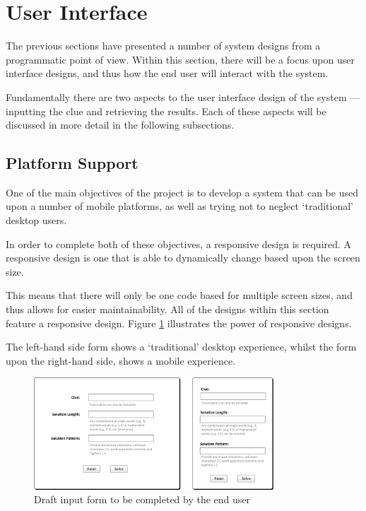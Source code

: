 \section{User Interface}
\label{sec:design_user_interface}

The previous sections have presented a number of system designs from a 
programmatic point of view. Within this section, there will be a focus upon 
user interface designs, and thus how the end user will interact with the system.

Fundamentally there are two aspects to the user interface design of the system 
--- inputting the clue and retrieving the results. Each of these aspects will 
be discussed in more detail in the following subsections.


\subsection{Platform Support} 
\label{sub:platform_support}

One of the main objectives of the project is to develop a system that can be 
used upon a number of mobile platforms, as well as trying not to neglect 
`traditional' desktop users.

In order to complete both of these objectives, a responsive design is required.
A responsive design is one that is able to dynamically change based upon the 
screen size.

This means that there will only be one code based for multiple screen sizes, and
thus allows for easier maintainability. All of the designs within this section 
feature a responsive design. Figure \ref{fig:input_form_compare} illustrates the
power of responsive designs.

The left-hand side form shows a `traditional' desktop experience, whilst the 
form upon the right-hand side, shows a mobile experience.

\begin{figure}[H]
  \centering
  \includegraphics[width=0.8\textwidth]{ui/form_comparison.jpg}
  \caption{Draft input form to be completed by the end user}
  \label{fig:input_form_compare}
\end{figure}


